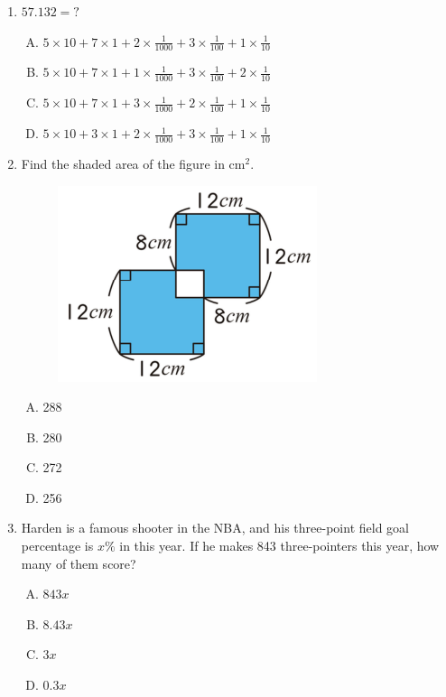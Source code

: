 \documentclass[12pt]{scrartcl}
\begin{document}
\begin{enumerate}
\newpage
\item $57.132 = ?$
        \begin{enumerate}[(A)]
            \item $5 \times 10 + 7 \times 1 + 2 \times \frac{1}{1000} + 3 \times \frac{1}{100} + 1 \times \frac{1}{10}$
            \item $5 \times 10 + 7 \times 1 + 1 \times \frac{1}{1000} + 3 \times \frac{1}{100} + 2 \times \frac{1}{10}$
            \item $5 \times 10 + 7 \times 1 + 3 \times \frac{1}{1000} + 2 \times \frac{1}{100} + 1 \times \frac{1}{10}$
            \item $5 \times 10 + 3 \times 1 + 2 \times \frac{1}{1000} + 3 \times \frac{1}{100} + 1 \times \frac{1}{10}$
        \end{enumerate} \hrulefill

\item Find the shaded area of the figure in cm$^2$.
    \begin{figure}[h]
        \centering
        \includegraphics[scale=0.7]{StarGen/0Figure/wmi-2020-5a-7.png}
    \end{figure}
    \begin{multicols}{4}
        \begin{enumerate}[(A)]
            \item 288
            \item 280
            \item 272
            \item 256
        \end{enumerate}
    \end{multicols} \hrulefill

\item Harden is a famous shooter in the NBA, and his three-point field goal percentage is $x\%$ in this year. If he makes 843 three-pointers this year, how many of them score?
    \begin{multicols}{4}
        \begin{enumerate}[(A)]
            \item $843x$
            \item $8.43x$
            \item $3x$
            \item $0.3x$
        \end{enumerate}
    \end{multicols} \hrulefill


\end{enumerate}
\end{document}
